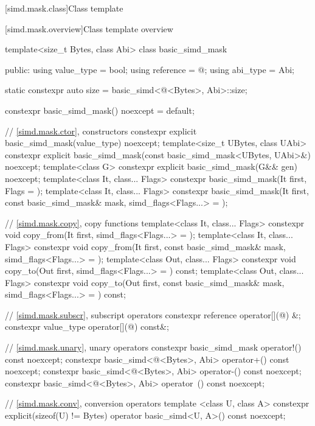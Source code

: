 [simd.mask.class]{Class template }

[simd.mask.overview]{Class template  overview}

\begin{codeblock}
template<size_t Bytes, class Abi> class basic_simd_mask {
public:
  using value_type = bool;
  using reference = @\seebelow@;
  using abi_type = Abi;

  static constexpr auto size = basic_simd<@\integerfrom@<Bytes>, Abi>::size;

  constexpr basic_simd_mask() noexcept = default;

  // \ref{simd.mask.ctor},  constructors
  constexpr explicit basic_simd_mask(value_type) noexcept;
  template<size_t UBytes, class UAbi>
    constexpr explicit basic_simd_mask(const basic_simd_mask<UBytes, UAbi>&) noexcept;
  template<class G> constexpr explicit basic_simd_mask(G&& gen) noexcept;
  template<class It, class... Flags>
    constexpr basic_simd_mask(It first, Flags = {});
  template<class It, class... Flags>
    constexpr basic_simd_mask(It first, const basic_simd_mask& mask, simd_flags<Flags...> = {});

  // \ref{simd.mask.copy},  copy functions
  template<class It, class... Flags>
    constexpr void copy_from(It first, simd_flags<Flags...> = {});
  template<class It, class... Flags>
    constexpr void copy_from(It first, const basic_simd_mask& mask, simd_flags<Flags...> = {});
  template<class Out, class... Flags>
    constexpr void copy_to(Out first, simd_flags<Flags...> = {}) const;
  template<class Out, class... Flags>
    constexpr void copy_to(Out first, const basic_simd_mask& mask, simd_flags<Flags...> = {}) const;

  // \ref{simd.mask.subscr},  subscript operators
  constexpr reference operator[](@\simdsizetype@) &;
  constexpr value_type operator[](@\simdsizetype@) const&;

  // \ref{simd.mask.unary},  unary operators
  constexpr basic_simd_mask operator!() const noexcept;
  constexpr basic_simd<@\integerfrom@<Bytes>, Abi> operator+() const noexcept;
  constexpr basic_simd<@\integerfrom@<Bytes>, Abi> operator-() const noexcept;
  constexpr basic_simd<@\integerfrom@<Bytes>, Abi> operator~() const noexcept;

  // \ref{simd.mask.conv},  conversion operators
  template <class U, class A>
    constexpr explicit(sizeof(U) != Bytes) operator basic_simd<U, A>() const noexcept;

}
\end{codeblock}
